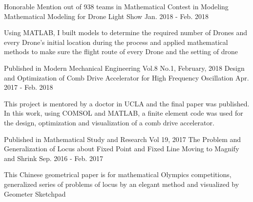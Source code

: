 

\begin{cventries}

  \cventry
    {Honorable Mention out of 938 teams in Mathematical Contest in Modeling} %
    {Mathematical Modeling for Drone Light Show} %
    {} %
    {Jan. 2018 - Feb. 2018} %
    {
      \begin{cvitems} %
        \item {Using MATLAB, I built models to determine the required number of Drones and every Drone’s initial location during the process and applied mathematical methods to make sure the flight route of every Drone and the setting of drone}
      \end{cvitems}
    }


  \cventry
    {Published in Modern Mechanical Engineering Vol.8 No.1, February, 2018} %
    {Design and Optimization of Comb Drive Accelerator for High Frequency Oscillation} %
    {} %
    {Apr. 2017 - Feb. 2018} %
    {
      \begin{cvitems} %
        \item {This project is mentored by a doctor in UCLA and the final paper was published. In this work, using COMSOL and MATLAB, a finite element code was used for the design, optimization and visualization of a comb drive accelerator.}
      \end{cvitems}
    }
    
  \cventry
    {Published in Mathematical Study and Research Vol 19, 2017} %
    {The Problem and Generalization of Locus about Fixed Point and Fixed Line Moving to Magnify and Shrink} %
    {} %
    {Sep. 2016 - Feb. 2017} %
    {
      \begin{cvitems} %
        \item {This Chinese geometrical paper is for mathematical Olympics competitions, generalized series of problems of locus by an elegant method and visualized by Geometer Sketchpad}
      \end{cvitems}
    }
    

\end{cventries}
